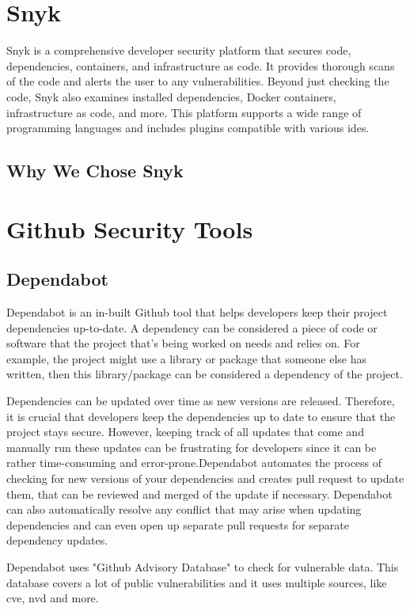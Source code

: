 \section{Snyk}
Snyk is a comprehensive developer security platform that secures code, dependencies, containers, and infrastructure as code. It provides thorough scans of the code and alerts the user to any vulnerabilities. Beyond just checking the code, Snyk also examines installed dependencies, Docker containers, infrastructure as code, and more. This platform supports a wide range of programming languages and includes plugins compatible with various \acrlong{ide}s.\cite{snyk}
\subsection{Why We Chose Snyk}

\section{Github Security Tools}

\subsection{Dependabot}
Dependabot is an in-built Github tool that helps developers keep their project dependencies up-to-date. A dependency can be considered a piece of code or software that the project that's being worked on needs and relies on. For example, the project might use a library or package that someone else has written, then this library/package can be considered a dependency of the project. 

Dependencies can be updated over time as new versions are released. Therefore, it is crucial that developers keep the dependencies up to date to ensure that the project stays secure. However, keeping track of all updates that come and manually run these updates can be frustrating for developers since it can be rather time-consuming and error-prone.Dependabot automates the process of checking for new versions of your dependencies and creates pull request to update them, that can be reviewed and merged of the update if necessary. 
Dependabot can also automatically resolve any conflict that may arise when updating dependencies and can even open up separate pull requests for separate dependency updates.  \cite{GithubDependabot2}

Dependabot uses "Github Advisory Database" to check for vulnerable data. This database covers a lot of public vulnerabilities and it uses multiple sources, like \acrlong{cve}, \acrlong{nvd} and more. \cite{GithubDependabot1}

